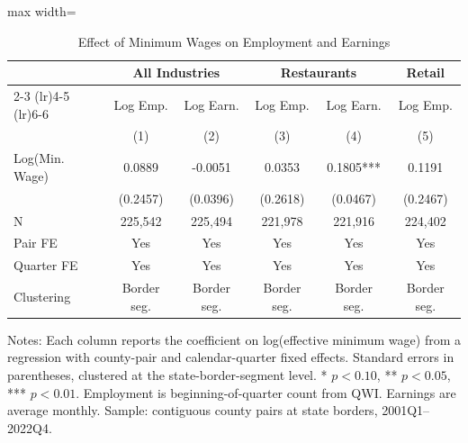 \begin{table}[H]
\centering
\caption{Effect of Minimum Wages on Employment and Earnings}
\label{tab:emp_earn}
\begin{threeparttable}
\begin{adjustbox}{max width=\textwidth}
\begin{tabular}{lccccc}
\toprule
 & \multicolumn{2}{c}{All Industries} & \multicolumn{2}{c}{Restaurants} & Retail \\
\cmidrule(lr){2-3} \cmidrule(lr){4-5} \cmidrule(lr){6-6}
 & Log Emp. & Log Earn. & Log Emp. & Log Earn. & Log Emp. \\
 & (1) & (2) & (3) & (4) & (5) \\
\midrule
Log(Min. Wage) & 0.0889 & -0.0051 & 0.0353 & 0.1805*** & 0.1191 \\
 & (0.2457) & (0.0396) & (0.2618) & (0.0467) & (0.2467) \\
\midrule
N & 225,542 & 225,494 & 221,978 & 221,916 & 224,402 \\
Pair FE & Yes & Yes & Yes & Yes & Yes \\
Quarter FE & Yes & Yes & Yes & Yes & Yes \\
Clustering & Border seg. & Border seg. & Border seg. & Border seg. & Border seg. \\
\bottomrule
\end{tabular}
\end{adjustbox}
\begin{tablenotes}[flushleft]
\small
\item Notes: Each column reports the coefficient on log(effective minimum wage) from a regression with county-pair and calendar-quarter fixed effects. Standard errors in parentheses, clustered at the state-border-segment level. * $p<0.10$, ** $p<0.05$, *** $p<0.01$. Employment is beginning-of-quarter count from QWI. Earnings are average monthly. Sample: contiguous county pairs at state borders, 2001Q1--2022Q4.
\end{tablenotes}
\end{threeparttable}
\end{table}
